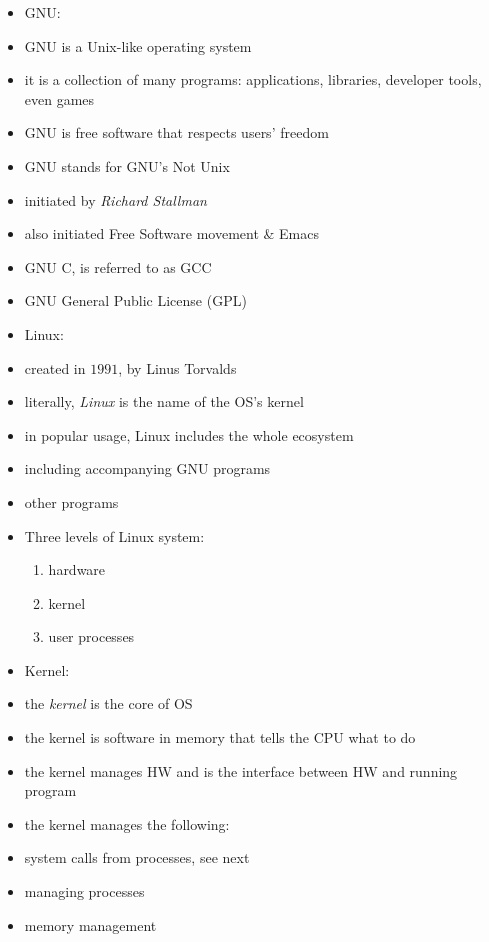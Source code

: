 \documentclass[twocolumn]{IEEEtran} %
\begin{document}
\begin{itemize}
    \item GNU:
    \bi
        \item GNU is a Unix-like operating system
        \bi
            \item it is a collection of many programs: applications, libraries, developer tools, even games
            \item GNU is free software that respects users' freedom
        \ei
        \item GNU stands for GNU's Not Unix
        \item initiated by \textit{Richard Stallman}
        \bi
            \item also initiated Free Software movement \& Emacs
        \ei
	    \item GNU C, is referred to as GCC
	    \item GNU General Public License (GPL)
    \ei
    \item Linux:
    \bi
	   \item created in $1991$, by Linus Torvalds
	   \item literally, \emph{Linux} is the name of the OS's kernel
	   \item in popular usage, Linux includes the whole ecosystem
	   \bi
        \item including accompanying GNU programs
	    \item other programs
	   \ei
    \ei
    \item Three levels of Linux system:
    \begin{enumerate}
      \item hardware
      \item kernel
      \item user processes
    \end{enumerate}
    \item Kernel:
    \bi
        \item the \emph{kernel} is the core of OS
        \item the kernel is software in memory that tells the CPU what to do
        \item the kernel manages HW and is the interface between HW and running program
        \item the kernel manages the following:
        \bi
            \item system calls from processes, see next
            \item managing processes
            \item memory management

\end{itemize}
\end{document}
